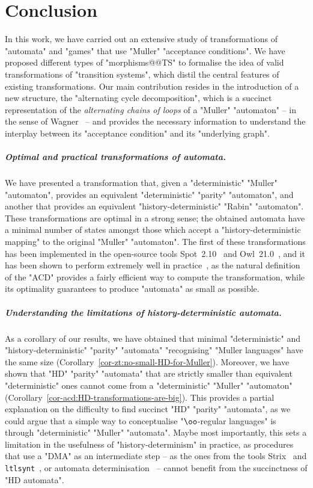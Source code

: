 \documentclass[10pt,a4paper]{amsart}
\begin{document}
 	

	\section{Conclusion}\label{section:conclusion}
	In this work, we have carried out an extensive study of transformations of "automata" and "games" that use "Muller" "acceptance conditions". We have proposed different types of "morphisms@@TS" to formalise the idea of valid transformations of "transition systems", which distil the central features of existing transformations. Our main contribution resides in the introduction of a new structure, the "alternating cycle decomposition", which is a succinct representation of the \emph{alternating chains of loops} of a "Muller" "automaton" -- in the sense of Wagner~\cite{Wagner1979omega} -- and provides the necessary information to understand the interplay between its "acceptance condition" and its "underlying graph".


\subparagraph*{Optimal and practical transformations of automata.} We have presented a transformation that, given a "deterministic" "Muller" "automaton",  provides an equivalent "deterministic" "parity" "automaton", and another that provides an equivalent "history-deterministic" "Rabin" "automaton". These transformations are optimal in a strong sense; the obtained automata have a minimal number of states amongst those which accept a "history-deterministic mapping" to the original "Muller" "automaton".
The first of these transformations has been implemented in the open-source tools Spot~2.10~\cite{Spot2.10CAV22} and Owl~21.0~\cite{KMS18Owl}, and it has been shown to perform extremely well in practice~\cite{CDMRS22Tacas}, as the natural definition of the "ACD" provides a fairly efficient way to compute the transformation, while its optimality guarantees to produce "automata" as small as possible. 


\subparagraph*{Understanding the limitations of history-deterministic automata.} As a corollary of our results, we have obtained that minimal "deterministic" and "history-deterministic" "parity" "automata" "recognising" "Muller languages" have the same size (Corollary~\ref{cor-zt:no-small-HD-for-Muller}). Moreover, we have shown that "HD" "parity" "automata" that are strictly smaller than equivalent "deterministic" ones cannot come from a "deterministic" "Muller" "automaton" (Corollary~\ref{cor-acd:HD-transformations-are-big}). This provides a partial explanation on the difficulty to find succinct "HD" "parity" "automata", as we could argue that a simple way to conceptualise "$\oo$-regular languages" is through "deterministic" "Muller" "automata". 
Maybe most importantly, this sets a limitation in the usefulness of "history-determinism" in practice, as procedures that use a "DMA" as an intermediate step -- as the ones from the tools Strix~\cite{LMS20SynthesisLTL} and \texttt{ltlsynt}~\cite{MichaudColange18Synt}, or  automata determinisation~\cite{Piterman2006fromNDBuchi,Schewe2009tighter,LodingP19} -- cannot benefit from the succinctness of "HD automata".
\end{document}
